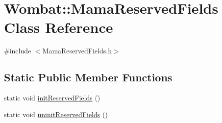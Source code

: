\hypertarget{classWombat_1_1MamaReservedFields}{
\section{Wombat::MamaReservedFields Class Reference}
\label{classWombat_1_1MamaReservedFields}
}


{\ttfamily \#include $<$MamaReservedFields.h$>$}\subsection*{Static Public Member Functions}
\begin{DoxyCompactItemize}
\item 
static void \hyperlink{classWombat_1_1MamaReservedFields_a854650a414cad5b1614d7a54297d6bdf}{initReservedFields} ()
\item 
static void \hyperlink{classWombat_1_1MamaReservedFields_ae99847ee37db0da80f5ee7b52c96c31f}{uninitReservedFields} ()
\end{DoxyCompactItemize}
